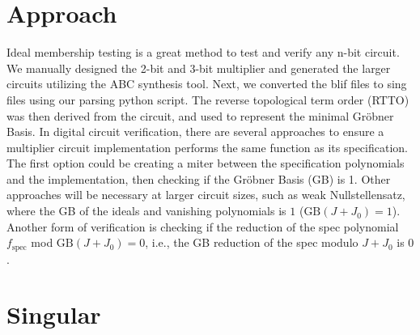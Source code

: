 \documentclass[conference]{IEEEtran}
\begin{document}
\section{Approach}
Ideal membership testing is a great method to test and verify any n-bit circuit.
We manually designed the 2-bit and 3-bit multiplier and generated the larger circuits utilizing the ABC synthesis tool. Next, we
converted the blif files to sing files using our parsing python script. The reverse topological term order (RTTO) was then derived from the circuit, and used to
represent the minimal Gröbner Basis. In digital circuit verification, there are several approaches to ensure a multiplier circuit implementation performs the same function as its specification. The first 
option could be creating a miter between the specification polynomials and the implementation, then checking if the Gröbner Basis (GB) is 1. Other approaches will be necessary at larger circuit sizes, 
such as weak Nullstellensatz, where the GB of the ideals and vanishing polynomials is $1$ ($\text{GB}(J + J_{0}) = 1$). Another form of verification is checking if the reduction of the spec 
polynomial $f_{\text{spec}}$ mod $\text{GB}(J + J_{0}) = 0$, i.e., the GB reduction of the spec modulo $J+J_{0}$ is $0$.

\section{Singular}
\end{document}
